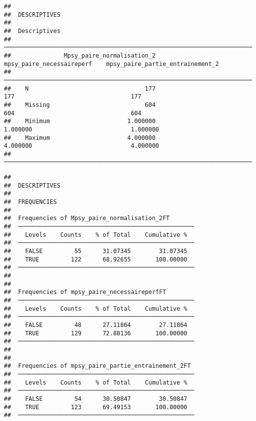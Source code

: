 \documentclass[
]{article}
\begin{document}
\begin{verbatim}
## 
##  DESCRIPTIVES
## 
##  Descriptives                                                                                               
##  ────────────────────────────────────────────────────────────────────────────────────────────────────────── 
##               Mpsy_paire_normalisation_2    mpsy_paire_necessaireperf    mpsy_paire_partie_entrainement_2   
##  ────────────────────────────────────────────────────────────────────────────────────────────────────────── 
##    N                                 177                          177                                 177   
##    Missing                           604                          604                                 604   
##    Minimum                      1.000000                     1.000000                            1.000000   
##    Maximum                      4.000000                     4.000000                            4.000000   
##  ──────────────────────────────────────────────────────────────────────────────────────────────────────────
\end{verbatim}

\begin{verbatim}
## 
##  DESCRIPTIVES
## 
##  FREQUENCIES
## 
##  Frequencies of Mpsy_paire_normalisation_2FT        
##  ────────────────────────────────────────────────── 
##    Levels    Counts    % of Total    Cumulative %   
##  ────────────────────────────────────────────────── 
##    FALSE         55      31.07345        31.07345   
##    TRUE         122      68.92655       100.00000   
##  ────────────────────────────────────────────────── 
## 
## 
##  Frequencies of mpsy_paire_necessaireperfFT         
##  ────────────────────────────────────────────────── 
##    Levels    Counts    % of Total    Cumulative %   
##  ────────────────────────────────────────────────── 
##    FALSE         48      27.11864        27.11864   
##    TRUE         129      72.88136       100.00000   
##  ────────────────────────────────────────────────── 
## 
## 
##  Frequencies of mpsy_paire_partie_entrainement_2FT  
##  ────────────────────────────────────────────────── 
##    Levels    Counts    % of Total    Cumulative %   
##  ────────────────────────────────────────────────── 
##    FALSE         54      30.50847        30.50847   
##    TRUE         123      69.49153       100.00000   
##  ──────────────────────────────────────────────────
\end{verbatim}
\end{document}
